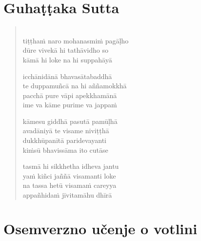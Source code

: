 

\cleartoverso
\chapter*{Guhaṭṭaka Sutta}

\begin{verse}

\\
tiṭṭhaṁ naro mohanasmiṁ pagāḷho\\
dūre vivekā hi tathāvidho so\\
kāmā hi loke na hi suppahāyā

icchānidānā bhavasātabaddhā\\
te duppamuñcā na hi aññamokkhā\\
pacchā pure vāpi apekkhamānā\\
ime va kāme purime va jappaṁ

kāmesu giddhā pasutā pamūḷhā\\
avadāniyā te visame niviṭṭhā\\
dukkhūpanītā paridevayanti\\
kiṁsū bhavissāma ito cutāse

tasmā hi sikkhetha idheva jantu\\
yaṁ kiñci jaññā visamanti loke\\
na tassa hetū visamaṁ careyya\\
appañhidaṁ jīvitamāhu dhīrā

\end{verse}


\cleartorecto
\chapter{Osemverzno učenje o votlini}

